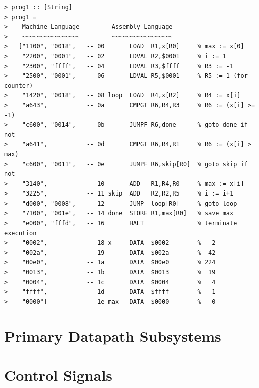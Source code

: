 \documentclass[a4paper,openany,fleqn]{book}
\begin{document}
{\footnotesize
\begin{verbatim}
> prog1 :: [String]
> prog1 =
> -- Machine Language         Assembly Language
> -- ~~~~~~~~~~~~~~~~         ~~~~~~~~~~~~~~~~~
>   ["1100", "0018",   -- 00       LOAD  R1,x[R0]     % max := x[0]
>    "2200", "0001",   -- 02       LDVAL R2,$0001     % i := 1
>    "2300", "ffff",   -- 04       LDVAL R3,$ffff     % R3 := -1
>    "2500", "0001",   -- 06       LDVAL R5,$0001     % R5 := 1 (for counter)
>    "1420", "0018",   -- 08 loop  LOAD  R4,x[R2]     % R4 := x[i]
>    "a643",           -- 0a       CMPGT R6,R4,R3     % R6 := (x[i] >= -1)
>    "c600", "0014",   -- 0b       JUMPF R6,done      % goto done if not
>    "a641",           -- 0d       CMPGT R6,R4,R1     % R6 := (x[i] > max)
>    "c600", "0011",   -- 0e       JUMPF R6,skip[R0]  % goto skip if not
>    "3140",           -- 10       ADD   R1,R4,R0     % max := x[i]
>    "3225",           -- 11 skip  ADD   R2,R2,R5     % i := i+1
>    "d000", "0008",   -- 12       JUMP  loop[R0]     % goto loop
>    "7100", "001e",   -- 14 done  STORE R1,max[R0]   % save max
>    "e000", "fffd",   -- 16       HALT               % terminate execution
>    "0002",           -- 18 x     DATA  $0002        %   2
>    "002a",           -- 19       DATA  $002a        %  42
>    "00e0",           -- 1a       DATA  $00e0        % 224
>    "0013",           -- 1b       DATA  $0013        %  19
>    "0004",           -- 1c       DATA  $0004        %   4
>    "ffff",           -- 1d       DATA  $ffff        %  -1
>    "0000"]           -- 1e max   DATA  $0000        %   0
\end{verbatim}
}

\section{Primary Datapath Subsystems}
\label{sec:prim-datap-subsyst}

\section{Control Signals}
\label{sec:control-signals}
\end{document}
